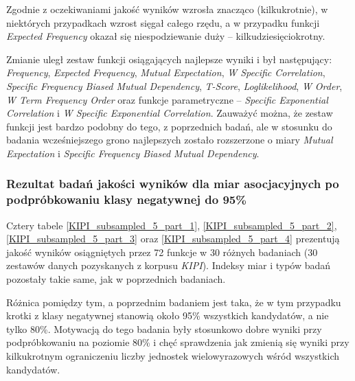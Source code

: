 Zgodnie z oczekiwaniami jakość wyników wzrosła znacząco (kilkukrotnie), w niektórych przypadkach wzrost sięgał całego rzędu, a w przypadku funkcji \emph{Expected Frequency} okazał się niespodziewanie duży -- kilkudziesięciokrotny.

\par
Zmianie uległ zestaw funkcji osiągających najlepsze wyniki i był następujący: \emph{Frequency}, \emph{Expected Frequency}, \emph{Mutual Expectation}, \emph{W Specific Correlation}, \emph{Specific Frequency Biased Mutual Dependency}, \emph{T-Score}, \emph{Loglikelihood}, \emph{W Order}, \emph{W Term Frequency Order} oraz funkcje parametryczne -- \emph{Specific Exponential Correlation} i \emph{W Specific Exponential Correlation}.
Zauważyć można, że zestaw funkcji jest bardzo podobny do tego, z poprzednich badań, ale w stosunku do badania wcześniejszego grono najlepszych zostało rozszerzone o miary \emph{Mutual Expectation} i \emph{Specific Frequency Biased Mutual Dependency}.


\subsubsection{Rezultat badań jakości wyników dla miar asocjacyjnych po podpróbkowaniu klasy negatywnej do 95\%}
Cztery tabele \ref{KIPI_subsampled_5_part_1}, \ref{KIPI_subsampled_5_part_2}, \ref{KIPI_subsampled_5_part_3} oraz \ref{KIPI_subsampled_5_part_4} prezentują jakość wyników osiągniętych przez 72 funkcje w 30 różnych badaniach (30 zestawów danych pozyskanych z korpusu \emph{KIPI}).
Indeksy miar i typów badań pozostały takie same, jak w poprzednich badaniach.

\par
Różnica pomiędzy tym, a poprzednim badaniem jest taka, że w tym przypadku krotki z klasy negatywnej stanowią około 95\% wszystkich kandydatów, a nie tylko 80\%.
Motywacją do tego badania były stosunkowo dobre wyniki przy podpróbkowaniu na poziomie 80\% i chęć sprawdzenia jak zmienią się wyniki przy kilkukrotnym ograniczeniu liczby jednostek wielowyrazowych wśród wszystkich kandydatów.

